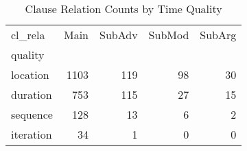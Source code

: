 \begin{table}[htbp!]
\centering
\caption{Clause Relation Counts by Time Quality}
\label{table:rela_ct}
\begin{tabular}{lrrrr}
\toprule
cl\_rela &  Main &  SubAdv &  SubMod &  SubArg \\
quality   &       &         &         &         \\
\midrule
location  &  1103 &     119 &      98 &      30 \\
duration  &   753 &     115 &      27 &      15 \\
sequence  &   128 &      13 &       6 &       2 \\
iteration &    34 &       1 &       0 &       0 \\
\bottomrule
\end{tabular}
\end{table}
